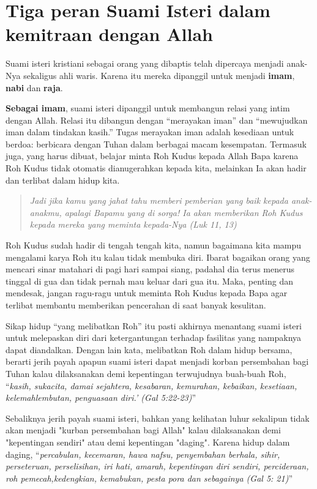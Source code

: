      

\section{Tiga peran Suami Isteri dalam kemitraan dengan Allah}

    Suami isteri kristiani sebagai orang yang dibaptis telah
    dipercaya menjadi anak-Nya sekaligus ahli waris. Karena itu mereka
    dipanggil untuk menjadi \textbf{imam}, \textbf{nabi} dan \textbf{raja}.
     
    \textbf{Sebagai imam}, suami isteri dipanggil untuk membangun relasi yang
    intim dengan Allah. Relasi itu dibangun dengan ``merayakan iman'' dan
    ``mewujudkan iman dalam tindakan kasih.'' Tugas merayakan iman adalah
    kesediaan untuk berdoa: berbicara dengan Tuhan dalam berbagai macam
    kesempatan. Termasuk juga, yang harus dibuat, belajar minta Roh
    Kudus kepada Allah Bapa karena Roh Kudus tidak otomatis
    dianugerahkan kepada kita, melainkan Ia akan hadir dan terlibat
    dalam hidup kita.

\begin{quote}
    \textit{Jadi jika kamu yang jahat tahu memberi pemberian yang baik kepada
    anak-anakmu, apalagi Bapamu yang di sorga! Ia akan memberikan Roh
    Kudus kepada mereka yang meminta kepada-Nya (Luk 11, 13)}
\end{quote}


    Roh Kudus sudah hadir di tengah tengah kita, namun bagaimana kita
    mampu mengalami karya Roh itu kalau tidak membuka diri. Ibarat
    bagaikan orang yang mencari sinar matahari di pagi hari sampai
    siang, padahal dia terus menerus tinggal di gua dan tidak pernah mau
    keluar dari gua itu. Maka, penting dan mendesak, jangan ragu-ragu
    untuk meminta Roh Kudus kepada Bapa agar terlibat membantu
    memberikan pencerahan di saat banyak kesulitan.

    Sikap hidup ``yang melibatkan Roh'' itu pasti akhirnya menantang
    suami isteri untuk  melepaskan diri dari ketergantungan terhadap 
    fasilitas yang nampaknya dapat diandalkan. Dengan lain kata,
    melibatkan Roh dalam hidup bersama, berarti  jerih payah apapun
    suami isteri dapat menjadi korban persembahan bagi Tuhan kalau
    dilaksanakan demi kepentingan terwujudnya buah-buah Roh, ``\textit{kasih,
    sukacita, damai sejahtera, kesabaran, kemurahan, kebaikan,
    kesetiaan, kelemahlembutan, penguasaan diri.' (Gal 5:22-23)}''
    
    Sebaliknya jerih payah suami isteri, bahkan yang kelihatan luhur
    sekalipun tidak akan menjadi "kurban persembahan bagi Allah" kalau
    dilaksanakan demi "kepentingan sendiri" atau demi kepentingan
    "daging". Karena hidup dalam daging, ``\textit{percabulan, kecemaran, hawa
    nafsu,  penyembahan berhala, sihir, perseteruan, perselisihan, iri
    hati, amarah, kepentingan diri sendiri, percideraan, roh
    pemecah,kedengkian, kemabukan, pesta pora dan sebagainya (Gal 5: 21)}''

